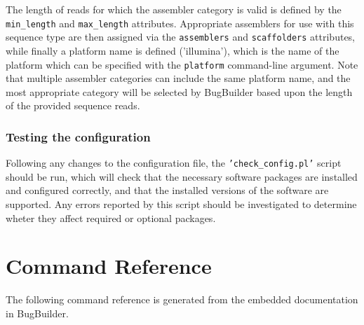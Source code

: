 \documentclass[a4paper,10pt]{article}
\begin{document}
The length of reads for which the assembler category is valid is defined by the {\tt min\_length} and {\tt max\_length} attributes. Appropriate assemblers for use with this sequence type are then assigned via the {\tt assemblers} and {\tt scaffolders} attributes, while finally a platform name is defined ('illumina'), which is the name of the platform which can be specified with the {\tt platform} command-line argument. Note that multiple assembler categories can include the same platform name, and the most appropriate category will be selected by BugBuilder based upon the length of the provided sequence reads.

\subsubsection{Testing the configuration}

Following any changes to the configuration file, the {\tt 'check\_config.pl'} script should be run, which will check that the necessary software packages are installed and configured correctly, and that the  installed versions of the software are supported. Any errors reported by this script should be investigated to determine wheter they affect required or optional packages. 

\section{Command Reference}

The following command reference is generated from the embedded documentation in BugBuilder. 


\end{document}

